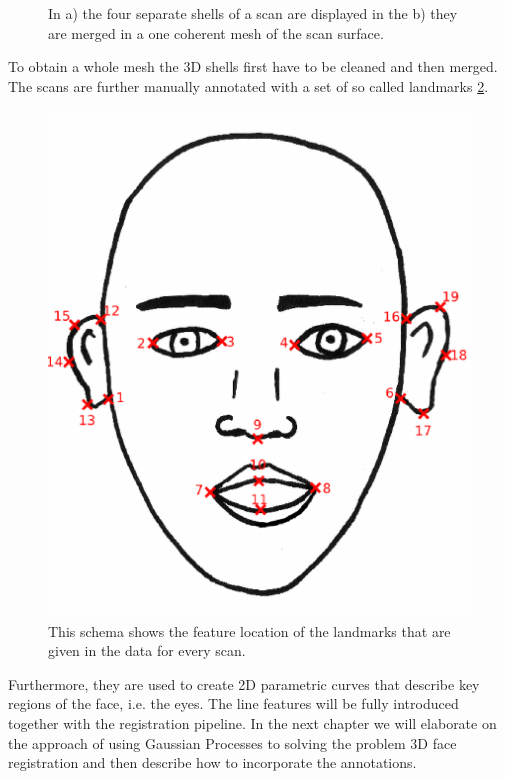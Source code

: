 \begin{figure}[h!]
\caption{In a) the four separate shells of a scan are displayed in the b) they are merged in a one coherent mesh of the scan surface.}
\label{fig:scan}
\end{figure}
To obtain a whole mesh the 3D shells first have to be cleaned and then merged.
The scans are further manually annotated with a set of so called landmarks \ref{fig:landmarks}. 
\begin{figure}[h!]
    \centering
    \includegraphics[width=.3\textwidth]{./resources/figures/schema_marked.eps}
    \caption{This schema shows the feature location of the landmarks that are given in the data for every scan.}
    \label{fig:landmarks}
\end{figure}
Furthermore, they are used to create 2D parametric curves that describe key regions of the face, i.e. the eyes. The line features will be fully introduced together with the registration pipeline. In the next chapter we will elaborate on the approach of using Gaussian Processes to solving the problem 3D face registration and then describe how to incorporate the annotations.

